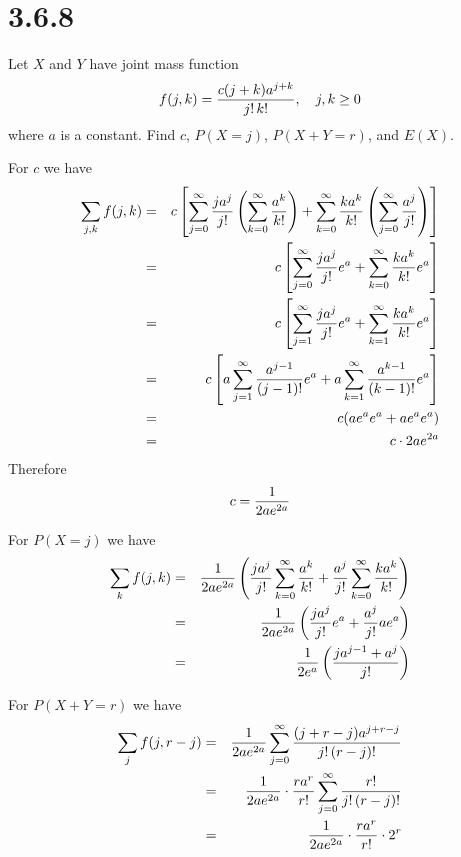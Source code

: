 \section*{3.6.8}
Let $X$ and $Y$ have joint mass function
$$f(j,k)={c(j+k)a^{j+k}\over j!\,k!},\quad j,k\ge0$$
where $a$ is a constant.
Find $c$, $P(X=j)$, $P(X+Y=r)$, and $E(X)$.

\bigskip
\noindent
For $c$ we have
\begin{eqnarray*}
\sum_{j,k}f(j,k)
&=&c\left[
\sum_{j=0}^\infty{ja^j\over j!}
\left(\sum_{k=0}^\infty{a^k\over k!}\right)
+
\sum_{k=0}^\infty{ka^k\over k!}
\left(\sum_{j=0}^\infty{a^j\over j!}\right)
\right]\\
%
&=&c\left[
\sum_{j=0}^\infty{ja^j\over j!}e^a
+
\sum_{k=0}^\infty{ka^k\over k!}e^a
\right]\\
%
&=&c\left[
\sum_{j=1}^\infty{ja^j\over j!}e^a
+
\sum_{k=1}^\infty{ka^k\over k!}e^a
\right]\\
%
&=&c\left[
a\sum_{j=1}^\infty{a^{j-1}\over(j-1)!}e^a
+
a\sum_{k=1}^\infty{a^{k-1}\over(k-1)!}e^a
\right]\\
&=&c(ae^ae^a+ae^ae^a)\\
&=&c\cdot2ae^{2a}
\end{eqnarray*}
Therefore
$$c={1\over2ae^{2a}}$$

\bigskip
\noindent
For $P(X=j)$ we have
\begin{eqnarray*}
\sum_k f(j,k)
&=&{1\over2ae^{2a}}
\left({ja^j\over j!}\sum_{k=0}^\infty{a^k\over k!}
+{a^j\over j!}\sum_{k=0}^\infty{ka^k\over k!}\right)\\
&=&{1\over2ae^{2a}}\left(
{ja^j\over j!}e^a+{a^j\over j!}ae^a
\right)\\
&=&{1\over2e^a}\left({ja^{j-1}+a^j\over j!}\right)
\end{eqnarray*}

\bigskip
\noindent
For $P(X+Y=r)$ we have
\begin{eqnarray*}
\sum_j f(j,r-j)
&=&{1\over 2ae^{2a}}\sum_{j=0}^\infty
{(j+r-j)a^{j+r-j}\over j!\,(r-j)!}\\
&=&{1\over2ae^{2a}}\cdot
{ra^r\over r!}\sum_{j=0}^\infty{r!\over j!\,(r-j)!}\\
&=&{1\over2ae^{2a}}\cdot{ra^r\over r!}\cdot2^r
\end{eqnarray*}

